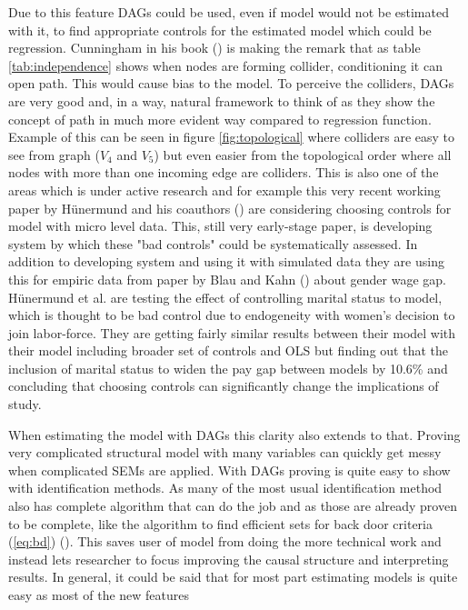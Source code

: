 \documentclass[main=english,12pt,a4paper,pdftex,econ,utf8]{aaltothesis}
\begin{document}
Due to this feature DAGs could be used, even if model would not be estimated with it, to find appropriate controls for the estimated model which could be regression. Cunningham in his book (\cite{Cunningham2021}) is making the remark that as table \ref{tab:independence} shows when nodes are forming collider, conditioning it can open path. This would cause bias to the model. To perceive the colliders, DAGs are very good and, in a way, natural framework to think of as they show the concept of path in much more evident way compared to regression function. Example of this can be seen in figure \ref{fig:topological} where colliders are easy to see from graph ($V_{4}$ and $V_{5}$) but even easier from the topological order where all nodes with more than one incoming edge are colliders. This is also one of the areas which is under active research and for example this very recent working paper by Hünermund and his coauthors (\cite{Hunermund2021}) are considering choosing controls for model with micro level data. This, still very early-stage paper, is developing system by which these "bad controls" could be systematically assessed. In addition to developing system and using it with simulated data they are using this for empiric data from paper by Blau and Kahn (\cite{Blau2017}) about gender wage gap. Hünermund et al. are testing the effect of controlling marital status to model, which is thought to be bad control due to endogeneity with women's decision to join labor-force. They are getting fairly similar results between their model with their model including broader set of controls and OLS but finding out that the inclusion of marital status to widen the pay gap between models by 10.6\% and concluding that choosing controls can significantly change the implications of study. 

When estimating the model with DAGs this clarity also extends to that. Proving very complicated structural model with many variables can quickly get messy when complicated SEMs are applied. With DAGs proving is quite easy to show with identification methods. As many of the most usual identification method also has complete algorithm that can do the job and as those are already proven to be complete, like the algorithm to find efficient sets for back door criteria (\ref{eq:bd}) (\cite{Correa2017}). This saves user of model from doing the more technical work and instead lets researcher to focus improving the causal structure and interpreting results. In general, it could be said that for most part estimating models is quite easy as most of the new features 
\end{document}
